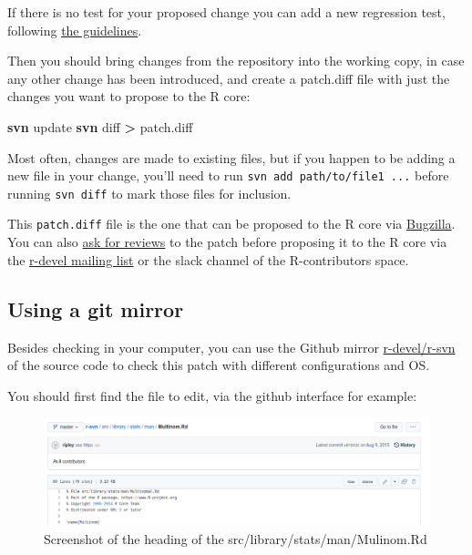 \documentclass[
]{book}
\newenvironment{Shaded}{\begin{snugshade}}{\end{snugshade}}
\newcommand{\FunctionTok}[1]{\textcolor[rgb]{0.13,0.29,0.53}{\textbf{#1}}}
\newcommand{\NormalTok}[1]{#1}
\newcommand{\OperatorTok}[1]{\textcolor[rgb]{0.81,0.36,0.00}{\textbf{#1}}}
\begin{document}
If there is no test for your proposed change you can add a new regression test, following \hyperref[TestR]{the guidelines}.

Then you should bring changes from the repository into the working copy, in case any other change has been introduced, and create a patch.diff file with just the changes you want to propose to the R core:

\begin{Shaded}
\begin{Highlighting}[]
\FunctionTok{svn}\NormalTok{ update}
\FunctionTok{svn}\NormalTok{ diff }\OperatorTok{\textgreater{}}\NormalTok{ patch.diff}
\end{Highlighting}
\end{Shaded}

Most often, changes are made to existing files, but if you happen to be adding a new file in your change, you'll need to run \texttt{svn\ add\ path/to/file1\ ...} before running \texttt{svn\ diff} to mark those files for inclusion.

This \texttt{patch.diff} file is the one that can be proposed to the R core via \hyperref[SubmitPatches]{Bugzilla}. You can also \hyperref[PatchesReview]{ask for reviews} to the patch before proposing it to the R core via the \href{https://stat.ethz.ch/mailman/listinfo/r-devel}{r-devel mailing list} or the slack channel of the R-contributors space.

\subsection{Using a git mirror}\label{using-a-git-mirror}

Besides checking in your computer, you can use the Github mirror \href{https://github.com/r-devel/r-svn}{r-devel/r-svn} of the source code to check this patch with different configurations and OS.

You should first find the file to edit, via the github interface for example:

\begin{figure}
\centering
\includegraphics{img/rsvn_file_to_edit.png}
\caption{Screenshot of the heading of the src/library/stats/man/Mulinom.Rd}
\end{figure}
\end{document}
